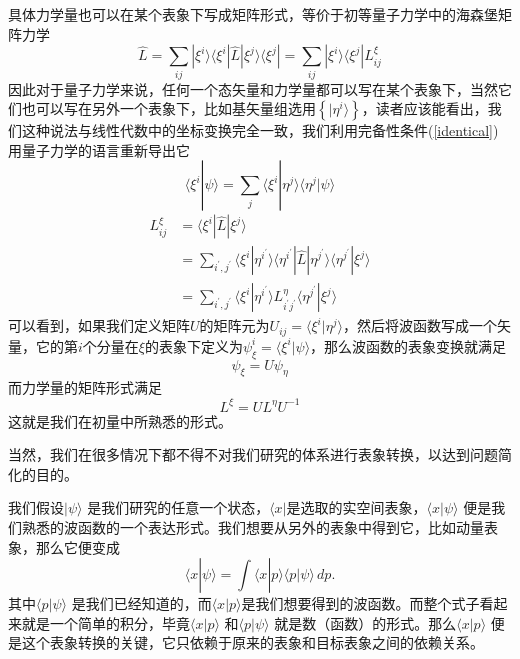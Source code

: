 \documentclass[12pt,a4paper,openany,twoside]{book}
\numberwithin{equation}{section}
\begin{document}
  具体力学量也可以在某个表象下写成矩阵形式，等价于初等量子力学中的海森堡矩阵力学
  \begin{equation}
    \hat{L}=\sum_{i j} | \xi^{i} \rangle\langle\xi^{i}|\hat{L}| \xi^{j}\rangle\langle\xi^{j}|=\sum_{i j}| \xi^{i}\rangle\langle\xi^{j} | L_{i j}^{\xi}
    \label{matrix picture of operator}
  \end{equation}
  因此对于量子力学来说，任何一个态矢量和力学量都可以写在某个表象下，当然它们也可以写在另外一个表象下，比如基矢量组选用$\left\{|\eta^i\rangle\right\}$，读者应该能看出，我们这种说法与线性代数中的坐标变换完全一致，我们利用完备性条件(\ref{identical})用量子力学的语言重新导出它
  \begin{equation}
    \langle\xi^{i} | \psi\rangle=\sum_{j}\langle\xi^{i} | \eta^{j}\rangle\langle\eta^{j} | \psi\rangle
  \end{equation}
  \begin{equation}
    \begin{aligned} L_{i j}^{\xi} &=\langle\xi^{i}|\hat{L}| \xi^{j}\rangle \\ &=\sum_{i^{\prime}, j^{\prime}}\langle\xi^{i} | \eta^{i^{\prime}}\rangle\langle\eta^{i^{\prime}}|\hat{L}| \eta^{j^{\prime}}\rangle\langle\eta^{j^{\prime}} | \xi^{j}\rangle \\ &=\sum_{i^{\prime}, j^{\prime}}\langle\xi^{i} | \eta^{i^{\prime}}\rangle L_{i^{\prime} j^{\prime}}^{\eta}\langle\eta^{j^{\prime}} | \xi^{j}\rangle \end{aligned}
  \end{equation}
  可以看到，如果我们定义矩阵$U$的矩阵元为$U_{ij}=\langle\xi^{i} | \eta^{j}\rangle$，然后将波函数写成一个矢量，它的第$i$个分量在$\xi$的表象下定义为$\psi_{\xi}^i=\langle\xi^{i} | \psi\rangle$，那么波函数的表象变换就满足
  \begin{equation}
    \psi_{\xi}=U \psi_{\eta}
  \end{equation}
  而力学量的矩阵形式满足
  \begin{equation}
    L^{\xi}=U L^{\eta} U^{-1}
  \end{equation}
  这就是我们在初量中所熟悉的形式。



  当然，我们在很多情况下都不得不对我们研究的体系进行表象转换，以达到问题简化的目的。

  我们假设$| \psi \rangle $ 是我们研究的任意一个状态，$\langle x |  $是选取的实空间表象，$\langle x | \psi \rangle $ 便是我们熟悉的波函数的一个表达形式。我们想要从另外的表象中得到它，比如动量表象，那么它便变成
   \[
  \langle x | \psi \rangle = \int \langle x | p \rangle \langle p | \psi \rangle  \, dp 
  .\] 
  其中$\langle p | \psi \rangle $ 是我们已经知道的，而$\langle x | p \rangle $是我们想要得到的波函数。而整个式子看起来就是一个简单的积分，毕竟$\langle x | p \rangle $ 和$\langle p | \psi \rangle $ 就是数（函数）的形式。那么$\langle x | p \rangle $ 便是这个表象转换的关键，它只依赖于原来的表象和目标表象之间的依赖关系。
\end{document}
